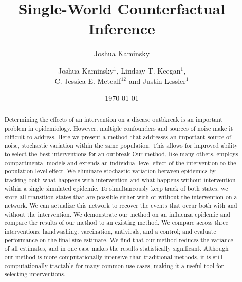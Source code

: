 \documentclass[openacc]{rsproca_new}%
\author{Joshua Kaminsky}
\date{\today}
\title{}
\begin{document}
\title{Single-World Counterfactual Inference}

\author{%
Joshua Kaminsky$^{1}$, Lindsay T. Keegan$^{1}$,\\C. Jessica E. Metcalf$^{12}$ and Justin Lessler$^{1}$}

\address{$^{1}$Department of Epidemiology, Johns Hopkins Bloomberg School of Public Health, Baltimore, MD, USA\\
$^{2}$Department of Ecology and Evolutionary Biology, Princeton University, Princeton, NJ, USA}

\subject{Epidemiology, Infectious Disease Modeling}



\begin{abstract} %
  Determining the effects of an intervention on a disease outbkreak is an important problem in epidemiology.
  However, multiple confounders and sources of noise make it difficult to address. %
  Here we present a method that addresses an important source of noise, stochastic variation within the same population. %
  This allows for improved ability to select the best interventions for an outbreak
  Our method, like many others, employs compartmental models and extends an individual-level effect of the intervention to the population-level effect. %
  We eliminate stochastic variation between epidemics by tracking both what happens with intervention and what happens without intervention within a single simulated epidemic. %
  To simultaneously keep track of both states, we store all transition states that are possible either with or without the intervention on a network. %
  We can actualize this network to recover the events that occur both with and without the intervention. %
  We demonstrate our method on an influenza epidemic and compare the results of our method to an existing method.
  We compare across three interventions: handwashing, vaccination, antivirals, and a control; and evaluate performance on the final size estimate.
  We find that our method reduces the variance of all estimates, and in one case makes the results statistically significant. %
  Although our method is more computationally intensive than traditional methods, it is still computationally tractable for many common use cases, making it a useful tool for selecting interventions. %
\end{abstract}
\end{document}
